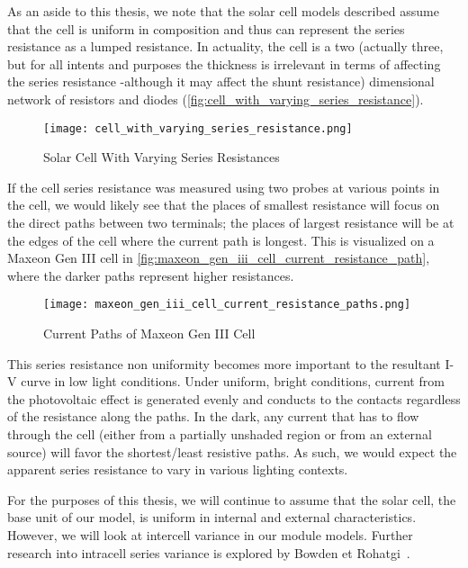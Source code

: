 As an aside to this thesis, we note that the solar cell models described assume
that the cell is uniform in composition and thus can represent the series
resistance as a lumped resistance. In actuality, the cell is a two (actually
three, but for all intents and purposes the thickness is irrelevant in terms of
affecting the series resistance -although it may affect the shunt resistance)
dimensional network of resistors and diodes
(\autoref{fig:cell_with_varying_series_resistance}).

\begin{figure}[!htbp]
    \centering
    \texttt{[image: cell\_with\_varying\_series\_resistance.png]}
    \caption{Solar Cell With Varying Series Resistances~\cite{pveducation_measurement_of_series_resistance}}
    \label{fig:cell_with_varying_series_resistance}
\end{figure}

If the cell series resistance was measured using two probes at various points in
the cell, we would likely see that the places of smallest resistance will focus
on the direct paths between two terminals; the places of largest resistance will
be at the edges of the cell where the current path is longest. This is
visualized on a Maxeon Gen III cell in
\autoref{fig:maxeon_gen_iii_cell_current_resistance_path}, where the darker
paths represent higher resistances.

\begin{figure}[!h]
    \centering
    \texttt{[image: maxeon\_gen\_iii\_cell\_current\_resistance\_paths.png]}
    \caption{Current Paths of Maxeon Gen III Cell}
    \label{fig:maxeon_gen_iii_cell_current_resistance_path}
\end{figure}

This series resistance non uniformity becomes more important to the
resultant \ac{I-V} curve in low light conditions. Under uniform, bright
conditions, current from the photovoltaic effect is generated evenly and
conducts to the contacts regardless of the resistance along the paths. In the
dark, any current that has to flow through the cell (either from a partially
unshaded region or from an external source) will favor the shortest/least
resistive paths. As such, we would expect the apparent series resistance to vary
in various lighting contexts.

For the purposes of this thesis, we will continue to assume that the solar cell,
the base unit of our model, is uniform in internal and external characteristics.
However, we will look at intercell variance in our module models. Further
research into intracell series variance is explored by Bowden et
Rohatgi~\cite{bowden_et_rohatgi}.



